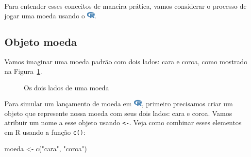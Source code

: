 \documentclass[
  letterpaper,
]{book}
\newenvironment{Shaded}{\begin{snugshade}}{\end{snugshade}}
\newcommand{\FunctionTok}[1]{\textcolor[rgb]{0.28,0.35,0.67}{#1}}
\newcommand{\NormalTok}[1]{\textcolor[rgb]{0.00,0.23,0.31}{#1}}
\newcommand{\OtherTok}[1]{\textcolor[rgb]{0.00,0.23,0.31}{#1}}
\newcommand{\StringTok}[1]{\textcolor[rgb]{0.13,0.47,0.30}{#1}}
\theoremstyle{definition}
\theoremstyle{plain}
\theoremstyle{remark}
\begin{document}
Para entender esses conceitos de maneira prática, vamos considerar o
processo de jogar uma moeda usando o
\includegraphics[width=1.13em,height=1em]{getting_started_with_r_files/figure-pdf/fa-icon-9b00320707d42527dde67262afb33ded.pdf}.

\subsection{Objeto moeda}\label{objeto-moeda}

Vamos imaginar uma moeda padrão com dois lados: cara e coroa, como
mostrado na Figura~\ref{fig-coin-head-tail}.

\begin{figure}


\caption{\label{fig-coin-head-tail}Os dois lados de uma moeda}

\end{figure}%

Para simular um lançamento de moeda em
\includegraphics[width=1.13em,height=1em]{getting_started_with_r_files/figure-pdf/fa-icon-9b00320707d42527dde67262afb33ded.pdf},
primeiro precisamos criar um objeto que represente nossa moeda com seus
dois lados: cara e coroa. Vamos atribuir um nome a esse objeto usando
\texttt{\textless{}-}. Veja como combinar esses elementos em R usando a
função \texttt{c()}:

\begin{Shaded}
\begin{Highlighting}[]
\NormalTok{moeda }\OtherTok{\textless{}{-}} \FunctionTok{c}\NormalTok{(}\StringTok{"cara"}\NormalTok{, }\StringTok{"coroa"}\NormalTok{)}
\end{Highlighting}
\end{Shaded}
\end{document}
